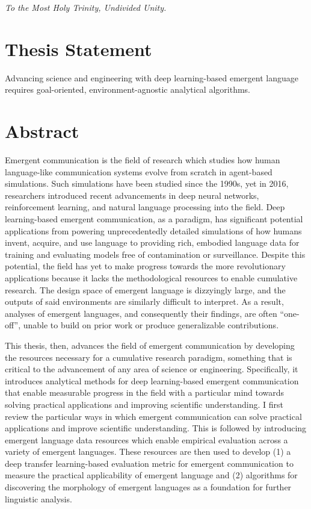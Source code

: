 
\null\vfill
\begin{center}
\textit{To the Most Holy Trinity, Undivided Unity.}
\end{center}
\vfill

\pagebreak

\thispagestyle{plain}
\null\vfill

\section*{Thesis Statement}
Advancing science and engineering with deep learning-based emergent language requires goal-oriented, environment-agnostic analytical algorithms.

\section*{Abstract}
Emergent communication is the field of research which studies how human language-like communication systems evolve from scratch in agent-based simulations.
Such simulations have been studied since the 1990s, yet in 2016, researchers introduced recent advancements in deep neural networks, reinforcement learning, and natural language processing into the field.
Deep learning-based emergent communication, as a paradigm, has significant potential applications from powering unprecedentedly detailed simulations of how humans invent, acquire, and use language
  to providing rich, embodied language data for training and evaluating models free of contamination or surveillance.
Despite this potential, the field has yet to make progress towards the more revolutionary applications because it lacks the methodological resources to enable cumulative research.
The design space of emergent language is dizzyingly large, and the outputs of said environments are similarly difficult to interpret.
As a result, analyses of emergent languages, and consequently their findings, are often ``one-off'', unable to build on prior work or produce generalizable contributions.

This thesis, then, advances the field of emergent communication by developing the resources necessary for a cumulative research paradigm, something that is critical to the advancement of any area of science or engineering.
Specifically, it introduces analytical methods for deep learning-based emergent communication that enable measurable progress in the field with a particular mind towards solving practical applications and improving scientific understanding.
I first review the particular ways in which emergent communication can solve practical applications and improve scientific understanding.
This is followed by introducing emergent language data resources which enable empirical evaluation across a variety of emergent languages.
These resources are then used to develop
  (1) a deep transfer learning-based evaluation metric for emergent communication to measure the practical applicability of emergent language
  and (2) algorithms for discovering the morphology of emergent languages as a foundation for further linguistic analysis.

